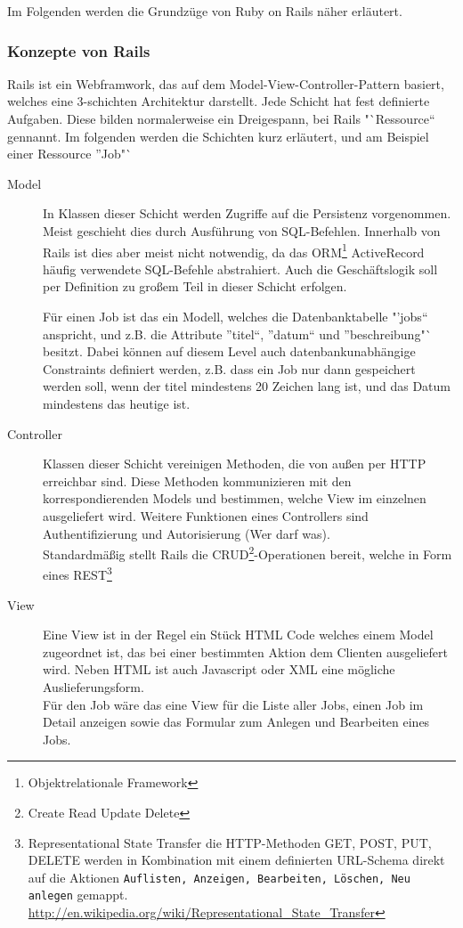 Im Folgenden werden die Grundzüge von Ruby on Rails näher erläutert.

\subsubsection{Konzepte von Rails}

Rails ist ein Webframwork, das auf dem Model-View-Controller-Pattern basiert, welches eine 3-schichten Architektur darstellt. Jede Schicht hat fest definierte Aufgaben. Diese bilden normalerweise ein Dreigespann, bei Rails "`Ressource"` gennannt. Im folgenden werden die Schichten kurz erläutert, und am Beispiel einer Ressource "'Job"` 
\begin{description}
 \item[Model] In Klassen dieser Schicht werden Zugriffe auf die Persistenz vorgenommen. Meist geschieht dies durch Ausführung von SQL-Befehlen. Innerhalb von Rails ist dies aber meist nicht notwendig, da das ORM\footnote{Objektrelationale Framework} ActiveRecord häufig verwendete SQL-Befehle abstrahiert. Auch die Geschäftslogik soll per Definition zu großem Teil in dieser Schicht erfolgen.
 
 Für einen Job ist das ein Modell, welches die Datenbanktabelle "'jobs"` anspricht, und z.B. die Attribute "'titel"`, "'datum"` und "'beschreibung"` besitzt. Dabei können auf diesem Level auch datenbankunabhängige Constraints definiert werden, z.B. dass ein Job nur dann gespeichert werden soll, wenn der titel mindestens 20 Zeichen lang ist, und das Datum mindestens das heutige ist.
 \item[Controller] Klassen dieser Schicht vereinigen Methoden, die von außen per HTTP erreichbar sind. Diese Methoden kommunizieren mit den korrespondierenden Models und bestimmen, welche View im einzelnen ausgeliefert wird. Weitere Funktionen eines Controllers sind Authentifizierung und Autorisierung (Wer darf was).\\
 Standardmäßig stellt Rails die CRUD\footnote{Create Read Update Delete}-Operationen bereit, welche in Form eines REST\footnote{Representational State Transfer die HTTP-Methoden GET, POST, PUT, DELETE werden in Kombination mit einem definierten URL-Schema direkt auf die Aktionen \texttt{Auflisten, Anzeigen, Bearbeiten, Löschen, Neu anlegen} gemappt.
 \url{http://en.wikipedia.org/wiki/Representational_State_Transfer}}
 \item[View] Eine View ist in der Regel ein Stück HTML Code welches einem Model zugeordnet ist, das bei einer bestimmten Aktion dem Clienten ausgeliefert wird. Neben HTML ist auch Javascript oder XML eine mögliche Auslieferungsform.\\
 Für den Job wäre das eine View für die Liste aller Jobs, einen Job im Detail anzeigen sowie das Formular zum Anlegen und Bearbeiten eines Jobs.
 \end{description}
